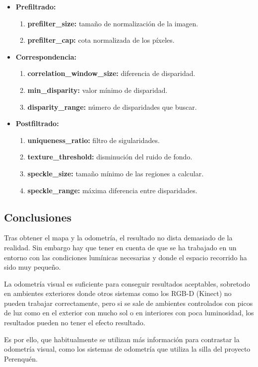 \begin{itemize}
  \item \textbf{Prefiltrado:}
  \begin{enumerate}
    \item \textbf{prefilter\_size:} tamaño de normalización de la imagen.
    \item \textbf{prefilter\_cap:} cota normalizada de los píxeles.
  \end{enumerate}
  \item \textbf{Correspondencia:}
  \begin{enumerate}
    \item \textbf{correlation\_window\_size:} diferencia de disparidad. 
    \item \textbf{min\_disparity:} valor mínimo de disparidad.
    \item \textbf{disparity\_range:} número de disparidades que buscar.
  \end{enumerate}
  \item \textbf{Postfiltrado:}
  \begin{enumerate}
    \item \textbf{uniqueness\_ratio:} filtro de sigularidades.
    \item \textbf{texture\_threshold:} disminución del ruido de fondo.
    \item \textbf{speckle\_size:} tamaño mínimo de las regiones a calcular.
    \item \textbf{speckle\_range:} máxima diferencia entre disparidades.
  \end{enumerate}
\end{itemize}

\subsection{Conclusiones}
Tras obtener el mapa y la odometría, el resultado no dista demasiado de la
realidad. Sin embargo hay que tener en cuenta de que se ha trabajado en un
entorno con las condiciones lumínicas necesarias y donde el espacio recorrido ha
sido muy pequeño.

La odometría visual es suficiente para conseguir resultados aceptables,
sobretodo en ambientes exteriores donde otros sistemas como los RGB-D (Kinect)
no pueden trabajar correctamente, pero si se sale de ambientes controlados con
picos de luz como en el exterior con mucho sol o en interiores con poca
luminosidad, los resultados pueden no tener el efecto resultado.

Es por ello, que habitualmente se utilizan más información para contrastar la
odometría visual, como los sistemas de odometría que utiliza la silla del
proyecto Perenquén.


